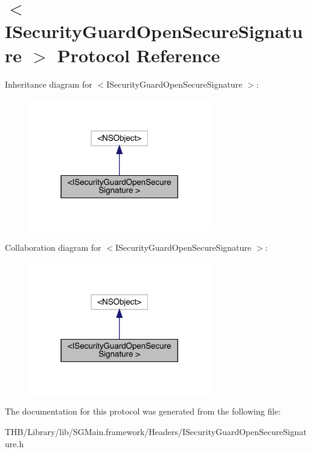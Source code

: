 \hypertarget{protocol_i_security_guard_open_secure_signature_01-p}{}\section{$<$I\+Security\+Guard\+Open\+Secure\+Signature $>$ Protocol Reference}
\label{protocol_i_security_guard_open_secure_signature_01-p}


Inheritance diagram for $<$I\+Security\+Guard\+Open\+Secure\+Signature $>$\+:\nopagebreak
\begin{figure}[H]
\begin{center}
\leavevmode
\includegraphics[width=225pt]{protocol_i_security_guard_open_secure_signature_01-p__inherit__graph}
\end{center}
\end{figure}


Collaboration diagram for $<$I\+Security\+Guard\+Open\+Secure\+Signature $>$\+:\nopagebreak
\begin{figure}[H]
\begin{center}
\leavevmode
\includegraphics[width=225pt]{protocol_i_security_guard_open_secure_signature_01-p__coll__graph}
\end{center}
\end{figure}


The documentation for this protocol was generated from the following file\+:\begin{DoxyCompactItemize}
\item 
T\+H\+B/\+Library/lib/\+S\+G\+Main.\+framework/\+Headers/I\+Security\+Guard\+Open\+Secure\+Signature.\+h\end{DoxyCompactItemize}

